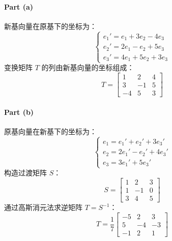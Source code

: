 \paragraph{Part (a)}  
新基向量在原基下的坐标为：
\[
\begin{cases}
e_1' = e_1 + 3e_2 - 4e_3 \\
e_2' = 2e_1 - e_2 + 5e_3 \\
e_3' = 4e_1 + 5e_2 + 3e_3
\end{cases}
\]
变换矩阵 \(T\) 的列由新基向量的坐标组成：
\[
T = \begin{bmatrix}
1 & 2 & 4 \\
3 & -1 & 5 \\
-4 & 5 & 3
\end{bmatrix}
\]

\paragraph{Part (b)}  
原基向量在新基下的坐标为：
\[
\begin{cases}
e_1 = e_1' + e_2' + 3e_3' \\
e_2 = 2e_1' - e_2' + 4e_3' \\
e_3 = 3e_1' + 5e_3'
\end{cases}
\]
构造过渡矩阵 \(S\)：
\[
S = \begin{bmatrix}
1 & 2 & 3 \\
1 & -1 & 0 \\
3 & 4 & 5
\end{bmatrix}
\]
通过高斯消元法求逆矩阵 \(T = S^{-1}\)：
\[
T = \frac{1}{7} \begin{bmatrix}
-5 & 2 & 3 \\
5 & -4 & -3 \\
-1 & 2 & 1
\end{bmatrix}
\]